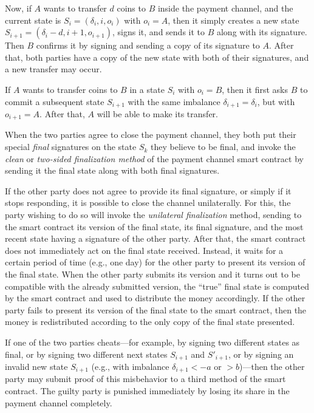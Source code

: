 \documentclass[12pt,oneside]{article}
\begin{document}
Now, if $A$ wants to transfer $d$ coins to $B$ inside the payment
channel, and the current state is $S_i=(\delta_i,i,o_i)$ with $o_i=A$,
then it simply creates a new state $S_{i+1}=(\delta_i-d,i+1,o_{i+1})$,
signs it, and sends it to $B$ along with its signature. Then $B$
confirms it by signing and sending a copy of its signature to
$A$. After that, both parties have a copy of the new state with both
of their signatures, and a new transfer may occur.

If $A$ wants to transfer coins to $B$ in a state $S_i$ with $o_i=B$,
then it first asks $B$ to commit a subsequent state $S_{i+1}$ with the
same imbalance $\delta_{i+1}=\delta_i$, but with $o_{i+1}=A$. After
that, $A$ will be able to make its transfer.

When the two parties agree to close the payment channel, they both put
their special {\em final\/} signatures on the state $S_k$ they believe
to be final, and invoke the {\em clean\/} or {\em two-sided
finalization method\/} of the payment channel smart contract by sending
it the final state along with both final signatures.

If the other party does not agree to provide its final signature, or
simply if it stops responding, it is possible to close the channel
unilaterally. For this, the party wishing to do so will invoke the
{\em unilateral finalization\/} method, sending to the smart contract
its version of the final state, its final signature, and the most
recent state having a signature of the other party. After that, the
smart contract does not immediately act on the final state
received. Instead, it waits for a certain period of time (e.g., one
day) for the other party to present its version of the final
state. When the other party submits its version and it turns out to be
compatible with the already submitted version, the ``true'' final
state is computed by the smart contract and used to distribute the
money accordingly. If the other party fails to present its version of
the final state to the smart contract, then the money is redistributed
according to the only copy of the final state presented.

If one of the two parties cheats---for example, by signing two
different states as final, or by signing two different next
states $S_{i+1}$ and $S'_{i+1}$, or by signing an invalid new state
$S_{i+1}$ (e.g., with imbalance $\delta_{i+1}<-a$ or $>b$)---then the
other party may submit proof of this misbehavior to a third method of
the smart contract. The guilty party is punished immediately by losing
its share in the payment channel completely.
\end{document}
